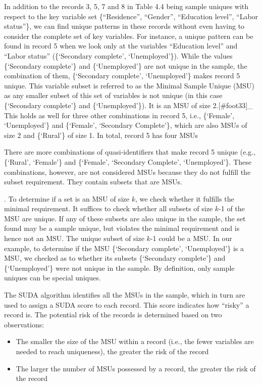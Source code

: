 \documentclass[letterpaper,10pt,english]{sphinxmanual}
\begin{document}
In addition to the records 3, 5, 7 and 8 in Table 4.4 being sample
uniques with respect to the key variable set \{“Residence”, “Gender”,
“Education level”, “Labor status”\}, we can find unique patterns in these
records without even having to consider the complete set of key
variables. For instance, a unique pattern can be found in record 5 when
we look only at the variables “Education level” and “Labor status”
(\{‘Secondary complete’, ‘Unemployed’\}). While the values \{‘Secondary
complete’\} and \{‘Unemployed’\} are not unique in the sample, the
combination of them, \{‘Secondary complete’, ‘Unemployed’\} makes record 5
unique. This variable subset is referred to as the Minimal Sample Unique
(MSU) as any smaller subset of this set of variables is not unique (in
this case \{‘Secondary complete’\} and \{‘Unemployed’\}). It is an MSU of
size 2.{[}\#foot33{]}\_ This holds as well
for three other combinations in record 5, i.e., \{‘Female’, ‘Unemployed’\}
and \{‘Female’, ‘Secondary Complete’\}, which are also MSUs of size 2 and
\{‘Rural’\} of size 1. In total, record 5 has four
MSUs %
\begin{footnote}[11]\sphinxAtStartFootnote
There are more combinations of quasi-identifiers that make record 5
unique (e.g., \{‘Rural’, ‘Female’\} and \{‘Female’, ‘Secondary
Complete’, ‘Unemployed’\}. These combinations, however, are not
considered MSUs because they do not fulfill the  subset
requirement. They contain subsets that are MSUs.
%
\end{footnote}. To determine if a set is an MSU of size
\(k\), we check whether it fulfills the minimal requirement. It
suffices to check whether all subsets of size \(k\)-1 of the MSU are
unique. If any of these subsets are also unique in the sample, the set
found may be a sample unique, but violates the minimal requirement and
is hence not an MSU. The unique subset of size \(k\)-1 could be a
MSU. In our example, to determine if the MSU \{‘Secondary complete’,
‘Unemployed’\} is a MSU, we checked as to whether its subsets \{‘Secondary
complete’\} and \{‘Unemployed’\} were not unique in the sample. By
definition, only sample uniques can be special uniques.

The SUDA algorithm identifies all the MSUs in the sample, which in turn
are used to assign a SUDA score to each record. This score indicates how
“risky” a record is. The potential risk of the records is determined
based on two observations:
\begin{itemize}
\item {} 
The smaller the size of the MSU within a record (i.e., the fewer
variables are needed to reach uniqueness), the greater the risk of
the record

\item {} 
The larger the number of MSUs possessed by a record, the greater the
risk of the record

\end{itemize}
\end{document}

